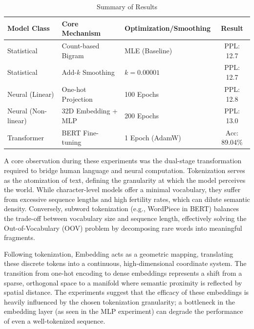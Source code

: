 \documentclass[11pt, a4paper]{article}
\begin{document}
\begin{table}[htbp]
\centering
\caption{Summary of Results}
\label{tab:results}
\begin{tabular}{@{}lllc@{}}
\toprule
\textbf{Model Class} & \textbf{Core Mechanism} & \textbf{Optimization/Smoothing} & \textbf{Result} \\ \midrule
Statistical          & Count-based Bigram      & MLE (Baseline)                  & PPL: 12.7       \\
Statistical          & Add-$k$ Smoothing       & $k=0.00001$                     & PPL: 12.7       \\
Neural (Linear)      & One-hot Projection      & 100 Epochs                      & PPL: 12.8       \\
Neural (Non-linear)  & 32D Embedding + MLP     & 200 Epochs                      & PPL: 13.0       \\ \midrule
Transformer          & BERT Fine-tuning        & 1 Epoch (AdamW)                 & Acc: 89.04\%    \\ \bottomrule
\end{tabular}
\end{table}

A core observation during these experiments was the dual-stage transformation required to bridge human language and neural computation. Tokenization serves as the atomization of text, defining the granularity at which the model perceives the world. While character-level models offer a minimal vocabulary, they suffer from excessive sequence lengths and high fertility rates, which can dilute semantic density. Conversely, subword tokenization (e.g., WordPiece in BERT) balances the trade-off between vocabulary size and sequence length, effectively solving the Out-of-Vocabulary (OOV) problem by decomposing rare words into meaningful fragments. 

Following tokenization, Embedding acts as a geometric mapping, translating these discrete tokens into a continuous, high-dimensional coordinate system. The transition from one-hot encoding to dense embeddings represents a shift from a sparse, orthogonal space to a manifold where semantic proximity is reflected by spatial distance. The experiments suggest that the efficacy of these embeddings is heavily influenced by the chosen tokenization granularity; a bottleneck in the embedding layer (as seen in the MLP experiment) can degrade the performance of even a well-tokenized sequence.
\end{document}
